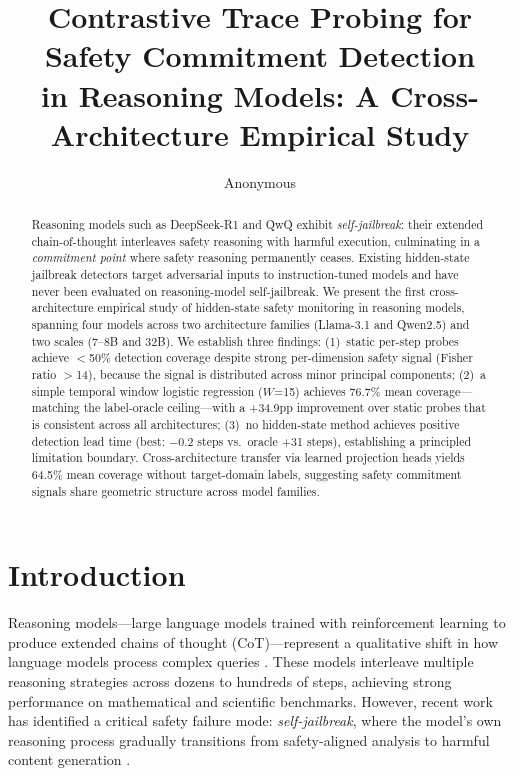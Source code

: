 \documentclass[11pt,a4paper]{article}
\title{Contrastive Trace Probing for Safety Commitment Detection\\in Reasoning Models: A Cross-Architecture Empirical Study}
\author{Anonymous}
\begin{document}
\maketitle

\begin{abstract}
Reasoning models such as DeepSeek-R1 and QwQ exhibit \emph{self-jailbreak}: their extended chain-of-thought interleaves safety reasoning with harmful execution, culminating in a \emph{commitment point} where safety reasoning permanently ceases.
Existing hidden-state jailbreak detectors target adversarial inputs to instruction-tuned models and have never been evaluated on reasoning-model self-jailbreak.
We present the first cross-architecture empirical study of hidden-state safety monitoring in reasoning models, spanning four models across two architecture families (Llama-3.1 and Qwen2.5) and two scales (7--8B and 32B).
We establish three findings:
(1)~static per-step probes achieve $<$50\% detection coverage despite strong per-dimension safety signal (Fisher ratio $>$14), because the signal is distributed across minor principal components;
(2)~a simple temporal window logistic regression ($W$=15) achieves 76.7\% mean coverage---matching the label-oracle ceiling---with a +34.9pp improvement over static probes that is consistent across all architectures;
(3)~no hidden-state method achieves positive detection lead time (best: $-$0.2 steps vs.\ oracle +31 steps), establishing a principled limitation boundary.
Cross-architecture transfer via learned projection heads yields 64.5\% mean coverage without target-domain labels, suggesting safety commitment signals share geometric structure across model families.
\end{abstract}

\section{Introduction}

Reasoning models---large language models trained with reinforcement learning to produce extended chains of thought (CoT)---represent a qualitative shift in how language models process complex queries \cite{deepseekr1,qwq32b}.
These models interleave multiple reasoning strategies across dozens to hundreds of steps, achieving strong performance on mathematical and scientific benchmarks.
However, recent work has identified a critical safety failure mode: \emph{self-jailbreak}, where the model's own reasoning process gradually transitions from safety-aligned analysis to harmful content generation \cite{harmthoughts,selfjailbreaking}.
\end{document}
